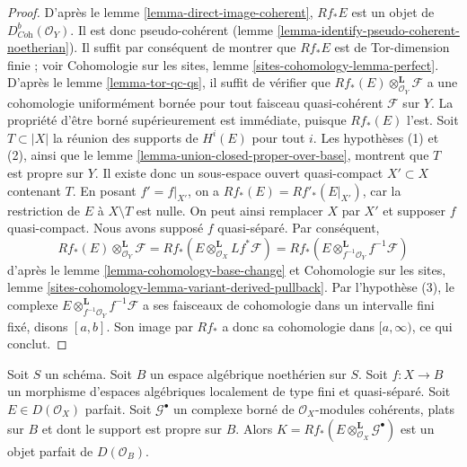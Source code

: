 \begin{proof}
D'apr\`es le lemme \ref{lemma-direct-image-coherent}, $Rf_*E$ est un objet de
$D^b_{\textit{Coh}}(\mathcal{O}_Y)$. Il est donc pseudo-coh\'erent
(lemme \ref{lemma-identify-pseudo-coherent-noetherian}). Il suffit par
cons\'equent de montrer que $Rf_*E$ est de Tor-dimension finie ; voir
Cohomologie sur les sites, lemme \ref{sites-cohomology-lemma-perfect}.
D'apr\`es le lemme \ref{lemma-tor-qc-qs}, il suffit de v\'erifier que
$Rf_*(E)\otimes_{\mathcal{O}_Y}^\mathbf{L}\mathcal{F}$ a une cohomologie
uniform\'ement born\'ee pour tout faisceau quasi-coh\'erent $\mathcal{F}$ sur
$Y$. La propri\'et\'e d'\^etre born\'e sup\'erieurement est imm\'ediate, puisque
$Rf_*(E)$ l'est. Soit $T\subset |X|$ la r\'eunion des supports de $H^i(E)$ pour
tout $i$. Les hypoth\`eses (1) et (2), ainsi que le lemme
\ref{lemma-union-closed-proper-over-base}, montrent que $T$ est propre
sur $Y$. Il existe donc un sous-espace ouvert quasi-compact
$X'\subset X$ contenant $T$. En posant $f'=f|_{X'}$, on a
$Rf_*(E)=Rf'_*(E|_{X'})$, car la restriction de $E$ \`a $X\setminus T$ est
nulle. On peut ainsi remplacer $X$ par $X'$ et supposer $f$ quasi-compact.
Nous avons suppos\'e $f$ quasi-s\'epar\'e. Par cons\'equent,
$$
Rf_*(E) \otimes_{\mathcal{O}_Y}^\mathbf{L} \mathcal{F} =
Rf_*\left(E \otimes_{\mathcal{O}_X}^\mathbf{L} Lf^*\mathcal{F}\right) =
Rf_*\left(E \otimes_{f^{-1}\mathcal{O}_Y}^\mathbf{L} f^{-1}\mathcal{F}\right)
$$
d'apr\`es le lemme \ref{lemma-cohomology-base-change} et Cohomologie sur les
sites, lemme \ref{sites-cohomology-lemma-variant-derived-pullback}.
Par l'hypoth\`ese (3), le complexe
$E\otimes_{f^{-1}\mathcal{O}_Y}^\mathbf{L}f^{-1}\mathcal{F}$ a ses faisceaux
de cohomologie dans un intervalle fini fix\'e, disons $[a,b]$. Son image par
$Rf_*$ a donc sa cohomologie dans $[a,\infty)$, ce qui conclut.
\end{proof}

\begin{lemma}
\label{lemma-tensor-perfect}
Soit $S$ un sch\'ema. Soit $B$ un espace alg\'ebrique noeth\'erien sur $S$.
Soit $f:X\to B$ un morphisme d'espaces alg\'ebriques localement de type fini
et quasi-s\'epar\'e. Soit $E\in D(\mathcal{O}_X)$ parfait. Soit
$\mathcal{G}^\bullet$ un complexe born\'e de $\mathcal{O}_X$-modules coh\'erents,
plats sur $B$ et dont le support est propre sur $B$. Alors
$K=Rf_*(E\otimes^\mathbf{L}_{\mathcal{O}_X}\mathcal{G}^\bullet)$ est un objet
parfait de $D(\mathcal{O}_B)$.
\end{lemma}

